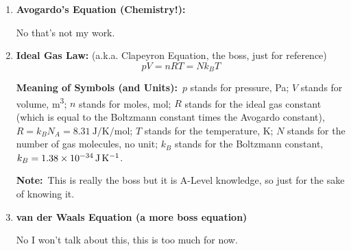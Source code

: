 \documentclass[8pt]{article}
\newcommand{\MeanSymb}{\textbf{Meaning of Symbols (and Units):}\ }
\newcommand{\DeriForm}{\textbf{Derived Formulae:}\ }
\newcommand{\Note}{\textbf{Note:}\ }
\begin{document}
\begin{enumerate}
                \DeriForm \(\frac{p_1}{T_1} = \frac{p_2}{T_2}, \frac{p_1}{p_2} = \frac{T_1}{T_2}\).

                \Note This only remains true if volume is a constant.

                \item \textbf{Avogardo's Equation (Chemistry!):}
                
                No that's not my work.

                \item \textbf{Ideal Gas Law:} (a.k.a. Clapeyron Equation, the boss, just for reference)
                \[
                    pV = nRT = Nk_{B}T
                \]

                \MeanSymb \(p\) stands for pressure, \unit{\pascal}; \(V\) stands for volume, \unit{\metre\cubed}; \(n\) stands for moles, \unit{\mole}; \(R\) stands for the ideal gas constant (which is equal to the Boltzmann constant times the Avogardo constant), \(R = k_B N_A = \qty{8.31}{\joule \per \kelvin \per \mole}\); \(T\) stands for the temperature, \unit{\kelvin}; \(N\) stands for the number of gas molecules, no unit; \(k_B\) stands for the Boltzmann constant, \(k_B = \qty{1.38 e -34}{\joule \per \kelvin}\).

                \Note This is really the boss but it is A-Level knowledge, so just for the sake of knowing it.
                
                \item \textbf{van der Waals Equation (a more boss equation)}
                
                No I won't talk about this, this is too much for now.
            \end{enumerate}
\end{document}
